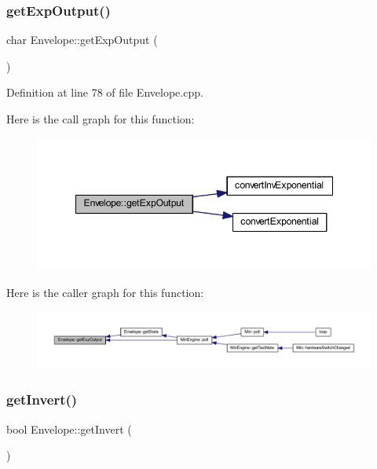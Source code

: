 \subsubsection{\texorpdfstring{get\+Exp\+Output()}{getExpOutput()}}
{\footnotesize\ttfamily char Envelope\+::get\+Exp\+Output (\begin{DoxyParamCaption}{ }\end{DoxyParamCaption})}



Definition at line 78 of file Envelope.\+cpp.

Here is the call graph for this function\+:
\nopagebreak
\begin{figure}[H]
\begin{center}
\leavevmode
\includegraphics[width=348pt]{d7/df3/class_envelope_a84eaf76b6ef7fbd2d394fba1f59cb909_cgraph}
\end{center}
\end{figure}
Here is the caller graph for this function\+:
\nopagebreak
\begin{figure}[H]
\begin{center}
\leavevmode
\includegraphics[width=350pt]{d7/df3/class_envelope_a84eaf76b6ef7fbd2d394fba1f59cb909_icgraph}
\end{center}
\end{figure}
\mbox{\label{class_envelope_a90c62a0768be44808c1a1ea731ff1f7c}} 
\subsubsection{\texorpdfstring{get\+Invert()}{getInvert()}}
{\footnotesize\ttfamily bool Envelope\+::get\+Invert (\begin{DoxyParamCaption}{ }\end{DoxyParamCaption})\hspace{0.3cm}{\ttfamily [inline]}}



